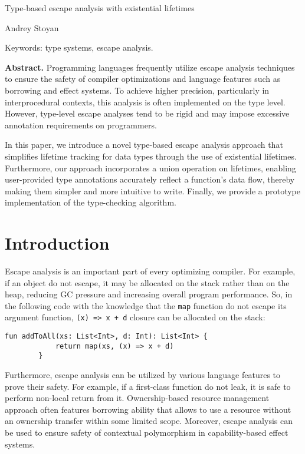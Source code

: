 \documentclass[11pt]{article}
\begin{document}
    \begin{center}
        \LARGE
        Type-based escape analysis with existential lifetimes

        \small
        Andrey Stoyan

        Keywords: type systems, escape analysis.
    \end{center}

    \textbf{Abstract.}
    Programming languages frequently utilize escape analysis techniques to ensure the safety of compiler optimizations and language features such as borrowing and effect systems.
    To achieve higher precision, particularly in interprocedural contexts, this analysis is often implemented on the type level.
    However, type-level escape analyses tend to be rigid and may impose excessive annotation requirements on programmers.

    In this paper, we introduce a novel type-based escape analysis approach that simplifies lifetime tracking for data types through the use of existential lifetimes.
    Furthermore, our approach incorporates a union operation on lifetimes, enabling user-provided type annotations accurately reflect a function’s data flow, thereby making them simpler and more intuitive to write.
    Finally, we provide a prototype implementation of the type-checking algorithm.


    \section{Introduction}

    Escape analysis is an important part of every optimizing compiler.
    For example, if an object do not escape, it may be allocated on the stack rather than on the heap, reducing GC pressure and increasing overall program performance. %
    So, in the following code with the knowledge that the \lstinline[language=colang]{map} function do not escape its argument function, \lstinline[language=colang]{(x) => x + d} closure can be allocated on the stack:
    \begin{lstlisting}[language=colang]
        fun addToAll(xs: List<Int>, d: Int): List<Int> {
            return map(xs, (x) => x + d)
        }
    \end{lstlisting}

    Furthermore, escape analysis can be utilized by various language features to prove their safety.
    For example, if a first-class function do not leak, it is safe to perform non-local return from it. %
    Ownership-based resource management approach often features borrowing ability that allows to use a resource without an ownership transfer within some limited scope. %
    Moreover, escape analysis can be used to ensure safety of contextual polymorphism in capability-based effect systems. %
\end{document}
